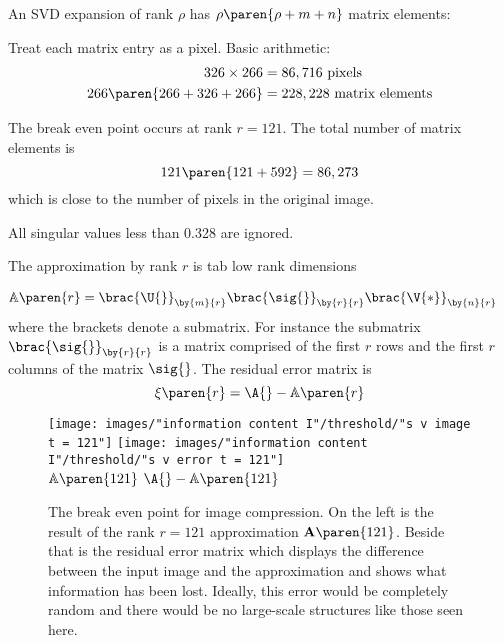 An SVD expansion of rank $\rho$ has $\rho \paren{\rho + m + n} $ matrix elements:

Treat each matrix entry as a pixel. 
Basic arithmetic: 
\begin{equation}
  \begin{split}
    326 \times 266 &= 86,716 \text{ pixels} \\
    266 \paren{266 + 326 + 266} &= 228,228 \text{ matrix elements}
  \end{split}
\end{equation}

The break even point  occurs at rank $r=121$. The total number of matrix elements is
\begin{equation}
  121\paren{121 + 592} = 86,273
\end{equation}
which is close to the number of pixels in the original image.

All singular values less than 0.328 are ignored.

The approximation by rank $r$ is 
tab low rank dimensions

\begin{equation}
  \begin{split}
    \mathbb{A}\paren{r} &= \brac{\U{}}_{\by{m}{r}} \brac{\sig{}}_{\by{r}{r}} \brac{\V{*}}_{\by{n}{r}}
  \end{split}
\end{equation}
where the brackets denote a submatrix. For instance the submatrix $\brac{\sig{}}_{\by{r}{r}}$ is a matrix comprised of the first $r$ rows and the first $r$ columns of the matrix $\sig{}$. The residual error matrix is 
\begin{equation}
  \xi\paren{r} = \A{} - \mathbb{A}\paren{r}
\end{equation}


\begin{figure}[htbp] %
   \centering
   \texttt{[image: images/"information content I"/threshold/"s v image t = 121"]} \qquad
   \texttt{[image: images/"information content I"/threshold/"s v error t = 121"]} \\
   $\mathbb{A}\paren{121}$ \quad \qquad \qquad \qquad \qquad \qquad \qquad $\A{} - \mathbb{A}\paren{121}$
   \caption[The break even point for image compression]{The break even point for image compression. On the left is the result of the rank $r=121$ approximation $\mathbf{A}\paren{121}$. Beside that is the residual error matrix which displays the difference between the input image and the approximation and shows what information has been lost. Ideally, this error would be completely random and there would be no large-scale structures like those seen here.}
   \label{fig:camille:break even}
\end{figure}

